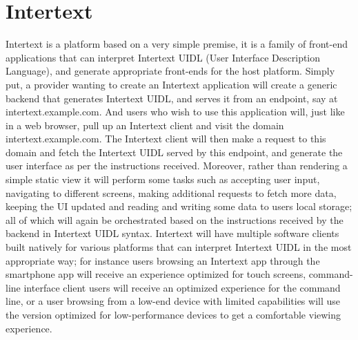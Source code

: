 
\chapter{Intertext}

Intertext is a platform based on a very simple premise, it is a family of front-end applications that can interpret Intertext UIDL (User Interface Description Language), and generate appropriate front-ends for the host platform. Simply put, a provider wanting to create an Intertext application will create a generic backend that generates Intertext UIDL, and serves it from an endpoint, say at intertext.example.com. And users who wish to use this application will, just like in a web browser, pull up an Intertext client and visit the domain intertext.example.com. The Intertext client will then make a request to this domain and fetch the Intertext UIDL served by this endpoint, and generate the user interface as per the instructions received. Moreover, rather than rendering a simple static view it will perform some tasks such as accepting user input, navigating to different screens, making additional requests to fetch more data, keeping the UI updated and reading and writing some data to users local storage; all of which will again be orchestrated based on the instructions received by the backend in Intertext UIDL syntax. Intertext will have multiple software clients built natively for various platforms that can interpret Intertext UIDL in the most appropriate way; for instance users browsing an Intertext app through the smartphone app will receive an experience optimized for touch screens, command-line interface client users will receive an optimized experience for the command line, or a user browsing from a low-end device with limited capabilities will use the version optimized for low-performance devices to get a comfortable viewing experience. 

